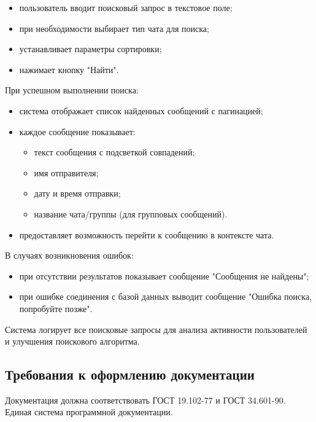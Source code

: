 \begin{itemize}
	\item пользователь вводит поисковый запрос в текстовое поле;
	\item при необходимости выбирает тип чата для поиска;
	\item устанавливает параметры сортировки;
	\item нажимает кнопку "Найти".
\end{itemize}

При успешном выполнении поиска:
\begin{itemize}
	\item система отображает список найденных сообщений с пагинацией;
	\item каждое сообщение показывает:
	\begin{itemize}
		\item текст сообщения с подсветкой совпадений;
		\item имя отправителя;
		\item дату и время отправки;
		\item название чата/группы (для групповых сообщений).
	\end{itemize}
	\item предоставляет возможность перейти к сообщению в контексте чата.
\end{itemize}

В случаях возникновения ошибок:
\begin{itemize}
	\item при отсутствии результатов показывает сообщение "Сообщения не найдены";
	\item при ошибке соединения с базой данных выводит сообщение "Ошибка поиска, попробуйте позже".
\end{itemize}

Система логирует все поисковые запросы для анализа активности пользователей и улучшения поискового алгоритма.

\subsection{Требования к оформлению документации}

Документация должна соответствовать ГОСТ 19.102-77 и ГОСТ 34.601-90. Единая система программной документации.